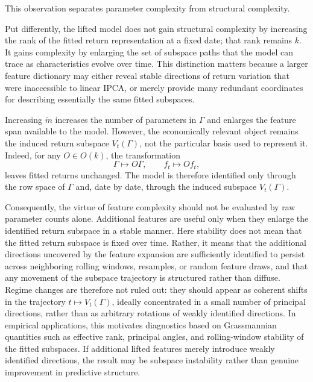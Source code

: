 \documentclass[11pt,letterpaper]{article}
\begin{document}
This observation separates parameter complexity from structural complexity.


Put differently, the lifted model does not gain structural complexity by increasing the rank of the fitted return representation at a fixed date; that rank remains $k$. It gains complexity by enlarging the set of subspace paths that the model can trace as characteristics evolve over time. This distinction matters because a larger feature dictionary may either reveal stable directions of return variation that were inaccessible to linear IPCA, or merely provide many redundant coordinates for describing essentially the same fitted subspaces.

 Increasing $\tilde m$ increases the number of parameters in $\Gamma$ and enlarges the feature span available to the model. However, the economically relevant object remains the induced return subspace $V_t(\Gamma)$, not the particular basis used to represent it. Indeed, for any $O\in O(k)$, the transformation
\begin{equation}
\Gamma \mapsto O\Gamma,\qquad f_t \mapsto Of_t,
\end{equation}
leaves fitted returns unchanged. The model is therefore identified only through the row space of $\Gamma$ and, date by date, through the induced subspace $V_t(\Gamma)$.


Consequently, the virtue of feature complexity should not be evaluated by raw parameter counts alone. Additional features are useful only when they enlarge the identified return subspace in a stable manner. Here stability does not mean that the fitted return subspace is fixed over time. Rather, it means that the additional directions uncovered by the feature expansion are sufficiently identified to persist across neighboring rolling windows, resamples, or random feature draws, and that any movement of the subspace trajectory is structured rather than diffuse. Regime changes are therefore not ruled out: they should appear as coherent shifts in the trajectory $t \mapsto V_t(\Gamma)$, ideally concentrated in a small number of principal directions, rather than as arbitrary rotations of weakly identified directions. In empirical applications, this motivates diagnostics based on Grassmannian quantities such as effective rank, principal angles, and rolling-window stability of the fitted subspaces. If additional lifted features merely introduce weakly identified directions, the result may be subspace instability rather than genuine improvement in predictive structure.
\end{document}
